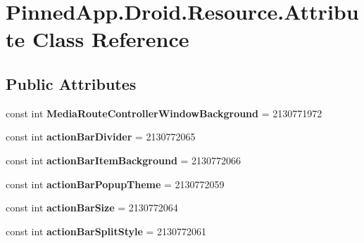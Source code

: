 \hypertarget{class_pinned_app_1_1_droid_1_1_resource_1_1_attribute}{}\section{Pinned\+App.\+Droid.\+Resource.\+Attribute Class Reference}
\label{class_pinned_app_1_1_droid_1_1_resource_1_1_attribute}
\subsection*{Public Attributes}
\begin{DoxyCompactItemize}
\item 
\mbox{\label{class_pinned_app_1_1_droid_1_1_resource_1_1_attribute_abdca581b56a431bba62e57edc8e9905c}} 
const int {\bfseries Media\+Route\+Controller\+Window\+Background} = 2130771972
\item 
\mbox{\label{class_pinned_app_1_1_droid_1_1_resource_1_1_attribute_aa7c5983188e7b8017b6c2a706d3c969a}} 
const int {\bfseries action\+Bar\+Divider} = 2130772065
\item 
\mbox{\label{class_pinned_app_1_1_droid_1_1_resource_1_1_attribute_a7819d789a4ea81145a454029f9aec403}} 
const int {\bfseries action\+Bar\+Item\+Background} = 2130772066
\item 
\mbox{\label{class_pinned_app_1_1_droid_1_1_resource_1_1_attribute_a166bfe5d730ec5c5fbb962dc96200b3c}} 
const int {\bfseries action\+Bar\+Popup\+Theme} = 2130772059
\item 
\mbox{\label{class_pinned_app_1_1_droid_1_1_resource_1_1_attribute_adcf90de471348bb352ab3bac9b931bde}} 
const int {\bfseries action\+Bar\+Size} = 2130772064
\item 
\mbox{\label{class_pinned_app_1_1_droid_1_1_resource_1_1_attribute_ab29528e8594a7192f8a606e441c8f361}} 
const int {\bfseries action\+Bar\+Split\+Style} = 2130772061

\end{DoxyCompactItemize}
